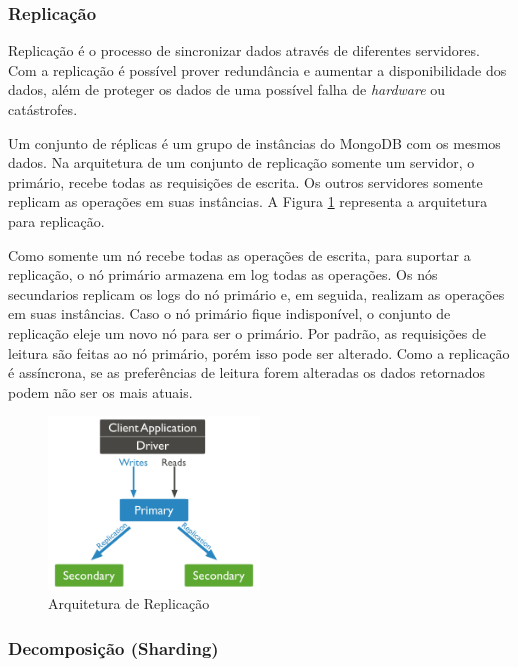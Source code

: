 \subsubsection{Replicação}

Replicação é o processo de sincronizar dados através de diferentes servidores. Com a replicação é possível prover redundância e aumentar a disponibilidade dos dados, além de proteger os dados de uma possível falha de \textit{hardware} ou catástrofes.

Um conjunto de réplicas é um grupo de instâncias do MongoDB com os mesmos dados. Na arquitetura de um conjunto de replicação somente um servidor, o primário, recebe todas as requisições de escrita. Os outros servidores somente replicam as operações em suas instâncias. A Figura \ref{fig:replication} representa a arquitetura para replicação.

Como somente um nó recebe todas as operações de escrita, para suportar a replicação, o nó primário armazena em log todas as operações. Os nós secundarios replicam os logs do nó primário e, em seguida, realizam as operações em suas instâncias. Caso o nó primário fique indisponível, o conjunto de replicação eleje um novo nó para ser o primário. Por padrão, as requisições de leitura são feitas ao nó primário, porém isso pode ser alterado. Como a replicação é assíncrona, se as preferências de leitura forem alteradas os dados retornados podem não ser os mais atuais.

	\begin{figure}[!htbp]
		\begin{center}
			\includegraphics[width=0.5\textwidth]{replication}
		\end{center}
		\caption{Arquitetura de Replicação ~\cite{sitemongodb}}
		\label{fig:replication}
	\end{figure}


\subsubsection{Decomposição (Sharding)}

